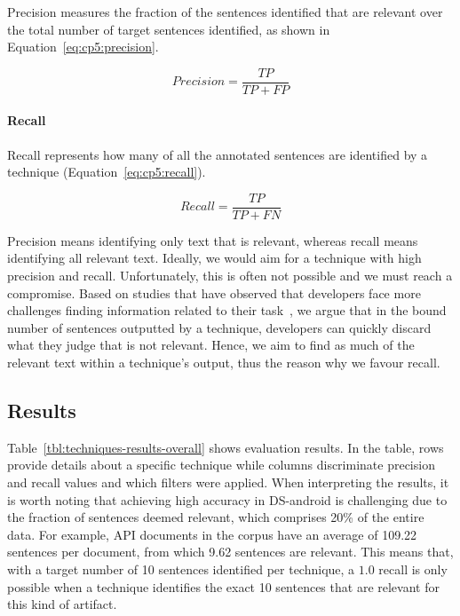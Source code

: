 Precision measures the fraction of the sentences identified that are relevant over the total number of target sentences identified, as shown in Equation~\ref{eq:cp5:precision}.



\begin{equation}
\label{eq:cp5:precision}    
    Precision = \frac{TP}{TP + FP}
\end{equation}



\paragraph{\textbf{Recall}} Recall represents how many of all the annotated sentences are identified by a technique (Equation~\ref{eq:cp5:recall}).


\begin{equation}
\label{eq:cp5:recall}        
    Recall = \frac{TP}{TP + FN}
\end{equation}



\medskip
Precision means identifying only text that is relevant, whereas recall means identifying all relevant text.
Ideally, we would aim for a technique with high precision and recall. Unfortunately, this is often not possible and we must reach a compromise.
Based on studies that have observed that developers face more challenges finding information related to their task~\cite{Robillard2015, Maalej2013}, we argue that in the bound number of sentences outputted by a technique, developers can quickly discard what they judge that is not relevant. Hence, we aim to find as much of the relevant text within a technique's output, thus the reason why we favour recall.







\subsection{Results}


Table~\ref{tbl:techniques-results-overall} shows evaluation results. 
In the table, rows provide details about a specific technique while columns discriminate 
precision and recall values and which filters were applied. 
When interpreting the results, it is worth noting that achieving high accuracy in \acs{DS-android} is challenging
due to the fraction of sentences deemed relevant, which comprises 20\% of the entire data.
For example, API documents in the corpus have an average of 109.22 sentences per document, from which 9.62 sentences are relevant. 
This means that, with a target number of 10 sentences identified per technique, a $1.0$ recall is only possible when a technique identifies the exact 10 sentences that are relevant for this kind of artifact.



